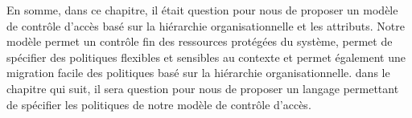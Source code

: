 \label{sectionConclusion}
En somme, dans ce chapitre, il était question pour nous de proposer un modèle de contrôle d'accès basé sur la hiérarchie organisationnelle et les attributs. Notre modèle permet un contrôle fin des ressources protégées du système, permet de spécifier des politiques flexibles et sensibles au contexte et permet également une migration facile des politiques basé sur la hiérarchie organisationnelle. dans le chapitre qui suit, il sera question pour nous de proposer un langage permettant de spécifier les politiques de notre modèle de contrôle d'accès.




	
	
